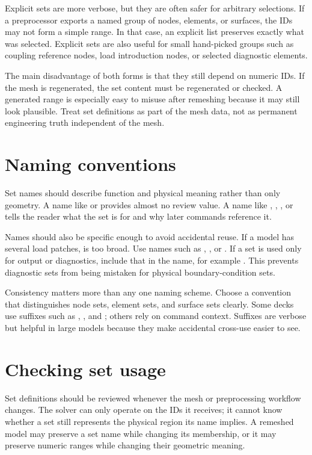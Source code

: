 Explicit sets are more verbose, but they are often safer for arbitrary selections. If a preprocessor exports a named group of nodes, elements, or surfaces, the IDs may not form a simple range. In that case, an explicit list preserves exactly what was selected. Explicit sets are also useful for small hand-picked groups such as coupling reference nodes, load introduction nodes, or selected diagnostic elements.

The main disadvantage of both forms is that they still depend on numeric IDs. If the mesh is regenerated, the set content must be regenerated or checked. A generated range is especially easy to misuse after remeshing because it may still look plausible. Treat set definitions as part of the mesh data, not as permanent engineering truth independent of the mesh.

\section{Naming conventions}

Set names should describe function and physical meaning rather than only geometry. A name like  or  provides almost no review value. A name like , , , or  tells the reader what the set is for and why later commands reference it.

Names should also be specific enough to avoid accidental reuse. If a model has several load patches,  is too broad. Use names such as , , or . If a set is used only for output or diagnostics, include that in the name, for example . This prevents diagnostic sets from being mistaken for physical boundary-condition sets.

Consistency matters more than any one naming scheme. Choose a convention that distinguishes node sets, element sets, and surface sets clearly. Some decks use suffixes such as , , and ; others rely on command context. Suffixes are verbose but helpful in large models because they make accidental cross-use easier to see.

\section{Checking set usage}

Set definitions should be reviewed whenever the mesh or preprocessing workflow changes. The solver can only operate on the IDs it receives; it cannot know whether a set still represents the physical region its name implies. A remeshed model may preserve a set name while changing its membership, or it may preserve numeric ranges while changing their geometric meaning.

